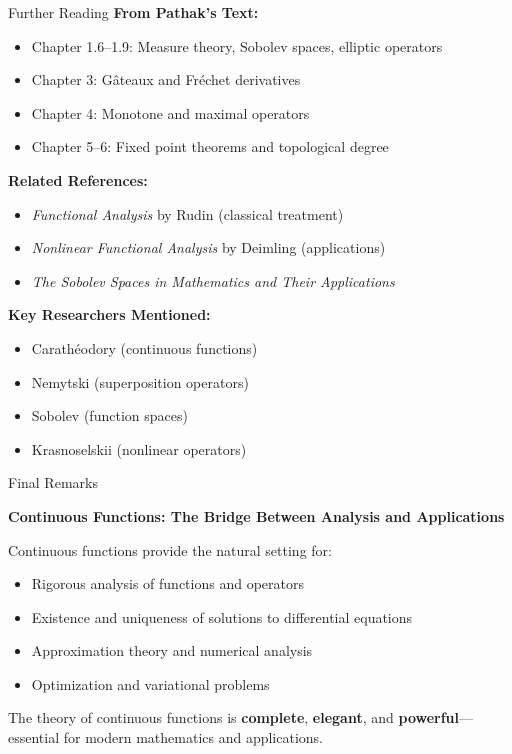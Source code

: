 \documentclass[aspectratio=169,10pt]{beamer}
\begin{document}
\begin{frame}{Further Reading}
    \small
    \textbf{From Pathak's Text:}
    \begin{itemize}
        \item Chapter 1.6--1.9: Measure theory, Sobolev spaces, elliptic operators
        \item Chapter 3: Gâteaux and Fréchet derivatives
        \item Chapter 4: Monotone and maximal operators
        \item Chapter 5--6: Fixed point theorems and topological degree
    \end{itemize}

    \vspace{0.3cm}
    \textbf{Related References:}
    \begin{itemize}
        \item \textit{Functional Analysis} by Rudin (classical treatment)
        \item \textit{Nonlinear Functional Analysis} by Deimling (applications)
        \item \textit{The Sobolev Spaces in Mathematics and Their Applications}
    \end{itemize}

    \vspace{0.3cm}
    \textbf{Key Researchers Mentioned:}
    \begin{itemize}
        \item Carathéodory (continuous functions)
        \item Nemytski (superposition operators)
        \item Sobolev (function spaces)
        \item Krasnoselskii (nonlinear operators)
    \end{itemize}
\end{frame}

\begin{frame}{Final Remarks}
    \begin{center}
        \Large\textbf{Continuous Functions: The Bridge Between Analysis and Applications}
    \end{center}

    \vspace{0.5cm}
    Continuous functions provide the natural setting for:
    \begin{itemize}
        \item Rigorous analysis of functions and operators
        \item Existence and uniqueness of solutions to differential equations
        \item Approximation theory and numerical analysis
        \item Optimization and variational problems
    \end{itemize}

    \vspace{0.5cm}
    The theory of continuous functions is \textbf{complete}, \textbf{elegant}, and \textbf{powerful}---essential for modern mathematics and applications.
\end{frame}
\end{document}
